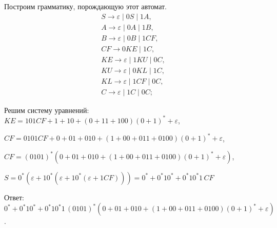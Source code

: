 \documentclass[fleqn,12pt, a4paper]{article}
\newcommand {\eps} {\varepsilon}
\begin{document}
\begin{enumerate}[label=(\roman{*})]

	Построим грамматику, порождающую этот автомат.
	\begin{equation}
		\begin{array}{l}
		S \to \eps \mid 0S \mid 1A, \\
		A \to \eps \mid 0A \mid 1B, \\
		B \to \eps \mid 0B \mid 1CF, \\
		CF \to 0KE \mid 1C, \\
		KE \to \eps \mid 1KU \mid 0C, \\
		KU \to \eps \mid 0KL \mid 1C, \\
		KL \to \eps \mid 1CF \mid 0C, \\
		C \to \eps \mid 1C \mid 0C;
		\end{array}
	\end{equation}

	Решим систему уравнений:\\

	$KE = 101CF + 1 + 10 + (0 + 11 + 100)(0+1)^* + \eps$,

	$CF = 0101CF + 0 + 01 + 010 + (1 + 00 + 011 + 0100)(0+1)^* + \eps$,

	$CF = (0101)^*(0 + 01 + 010 + (1 + 00 + 011 + 0100)(0+1)^* + \eps)$,

	$S = 0^*(\eps + 10^*(\eps + 10^*(\eps + 1CF))) = 0^* + 0^*10^* + 0^*10^*1\,CF$

	Ответ: $0^* + 0^*10^* + 0^*10^*1\,(0101)^*(0 + 01 + 010 + (1 + 00 + 011 + 0100)(0+1)^* + \eps)$.

\end{enumerate}
\end{document}
